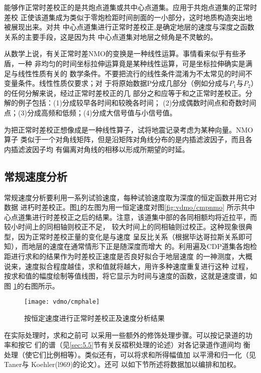 能够作正常时差校正的是共炮点道集或共中心点道集。应用于共炮点道集的正常时差校
正使该道集成为类似于零炮检距时间剖面的一小部分，这时地质构造突出地被展现出来。对共
中心点道集进行正常时差校正,是确定地层的速度与深度之函数关系的主要手段，这是因为共
中心点道集对地层之倾角是不灵敏的。

从数学上说，有关正常时差NMO的变换是一种线性运算。事情看来似乎有些矛盾，一种
非均匀的时间坐标拉伸运算竟是某种线性运算，可是坐标拉伸确实是满足与线性性质有关的
数学条件。不要把流行的线性条件混淆为不太常见的时间不变量条件。线性性质仅要求；对
于将原始数据P分成几部分（例如分成与$P_1$与$P_2$）的任何分解来说，经过正常时差校正的几
部分之和应等于和之正常时差校正。分解的例子包括：(1)分成较早各时间和较晚各时间；
(2)分成偶数时间点和奇数时间点；(3)分成高频和低频；(4)分成大信号值与小信号值。

为把正常时差校正想像成是一种线性算子，试将地震记录考虑为某种向量。NMO算子
类似于一个对角线矩阵，但是沿矩阵对角线分布的是内插滤波因子，而且各内插滤波因子均
有偏离对角线的相移以形成所期望的时延。

\subsection{常规速度分析}
\label{sec:3.5.2}

常规速度分析要利用一系列试验速度，每种试验速度取为深度的恒定函数并用它对数据
进朽时差校正。图\ref{fig:vdmo/cmphale}的左图为用一恒定速度对图\ref{fig:vdmo/cmpnmo}
所示共中心点道集进行时差校正之后的结果。注意，该道集中部的各同相额均将近拉平，而较小时间上的同相轴则校正不足，
较大时间上的同相轴则过校正。这种现象很典型，因为正常时差校正量的变化是与速度
呈反比关系（根据毕达哥拉斯关系即可知），而地层的速度在通常情形下正是随深度而增大
的。利用遍及CDP道集各炮检距进行求和的结果作为时差校正速度是否良好拟合于地层速度
的一神测度，大概说来，速度拟合程度越佳，求和值就将越大，用许多种速度重复进行这种
过程，按求和值的幅度绘制等值线图，将它显示为时间与速度的函数，这就是速度谱，如图
\ref{fig:vdmo/cmphale}的右图所示。

\begin{figure}[H]
\centering
\texttt{[image: vdmo/cmphale]}
\caption[cmphale]{按恒定速度进行正常时差校正及速度分析结果}
\label{fig:vdmo/cmphale}
\end{figure}

在实际处理时，求和之前可
以采用一些额外的修饰处理步骤。可以按记录道的功率和按它
们的谱（见\ref{sec:5.5}节有关反褶积处理的论述）对各记录道作道间均
衡处理（使它们比例相等）。类似还有，可以将求和所得幅值加
以平滑和归一化（见Taner与 Koehler(l969)的论文）。还可
以如下节所述将数据加以编排和加权。

